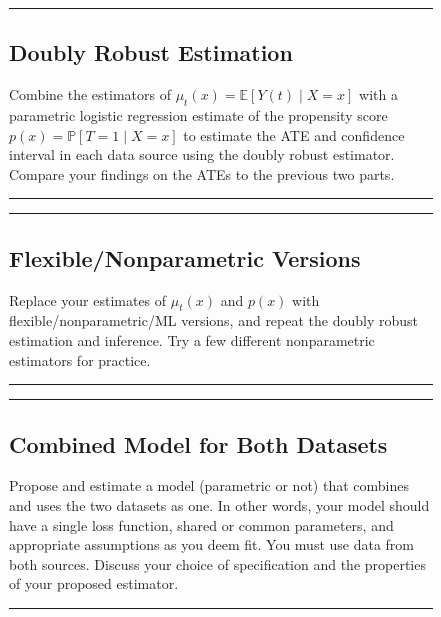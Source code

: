 \documentclass{article}
\newenvironment{colorparagraph}[1]{\par\color{#1}}{\par}
\begin{document}
\begin{figure}[H]
  \begin{colorparagraph}{questioncolor}
  \rule{\textwidth}{0.5pt}
  \label{q3c}
  \subsection{Doubly Robust Estimation}

  Combine the estimators of \( \mu_t(x) = \mathbb{E}[Y(t) \mid X = x] \) with a parametric logistic regression estimate of the propensity score \( p(x) = \mathbb{P}[T = 1 \mid X = x] \) to estimate the ATE and confidence interval in each data source using the doubly robust estimator. Compare your findings on the ATEs to the previous two parts.

  \rule{\textwidth}{0.5pt}
  \end{colorparagraph}
\end{figure}

\begin{figure}[H]
  \begin{colorparagraph}{questioncolor}
  \rule{\textwidth}{0.5pt}
  \label{q3d}
  \subsection{Flexible/Nonparametric Versions}

  Replace your estimates of \( \mu_t(x) \) and \( p(x) \) with flexible/nonparametric/ML versions, and repeat the doubly robust estimation and inference. Try a few different nonparametric estimators for practice.

  \rule{\textwidth}{0.5pt}
  \end{colorparagraph}
\end{figure}

\begin{figure}[H]
  \begin{colorparagraph}{questioncolor}
  \rule{\textwidth}{0.5pt}
  \label{q3e}
  \subsection{Combined Model for Both Datasets}

  Propose and estimate a model (parametric or not) that combines and uses the two datasets as one. In other words, your model should have a single loss function, shared or common parameters, and appropriate assumptions as you deem fit. You must use data from both sources. Discuss your choice of specification and the properties of your proposed estimator.

  \rule{\textwidth}{0.5pt}
  \end{colorparagraph}
\end{figure}
\end{document}
